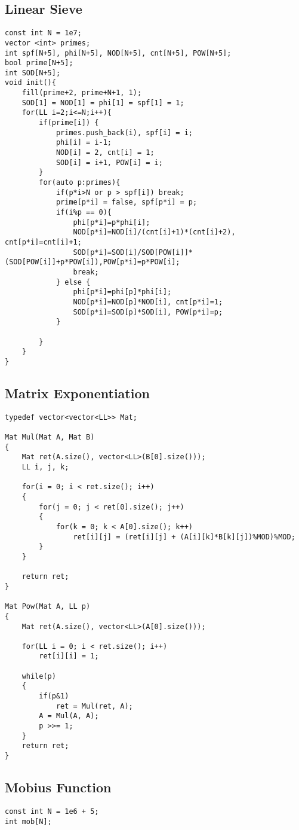 \documentclass[FSZ,a4paper,onesided]{article}
\begin{document}
\begin{multicols*}{\COLS}
\subsection{Linear Sieve}
\begin{lstlisting}
const int N = 1e7;
vector <int> primes;
int spf[N+5], phi[N+5], NOD[N+5], cnt[N+5], POW[N+5]; 
bool prime[N+5];
int SOD[N+5];
void init(){
    fill(prime+2, prime+N+1, 1);
    SOD[1] = NOD[1] = phi[1] = spf[1] = 1;
    for(LL i=2;i<=N;i++){
        if(prime[i]) {
            primes.push_back(i), spf[i] = i;
            phi[i] = i-1;
            NOD[i] = 2, cnt[i] = 1;
            SOD[i] = i+1, POW[i] = i;
        }
        for(auto p:primes){
            if(p*i>N or p > spf[i]) break;
            prime[p*i] = false, spf[p*i] = p;
            if(i%p == 0){
                phi[p*i]=p*phi[i];
                NOD[p*i]=NOD[i]/(cnt[i]+1)*(cnt[i]+2), cnt[p*i]=cnt[i]+1;
                SOD[p*i]=SOD[i]/SOD[POW[i]]*(SOD[POW[i]]+p*POW[i]),POW[p*i]=p*POW[i];
                break;
            } else {
                phi[p*i]=phi[p]*phi[i];
                NOD[p*i]=NOD[p]*NOD[i], cnt[p*i]=1;
                SOD[p*i]=SOD[p]*SOD[i], POW[p*i]=p;
            }

        }
    }
}

\end{lstlisting}
\subsection{Matrix Exponentiation}
\begin{lstlisting}
typedef vector<vector<LL>> Mat;

Mat Mul(Mat A, Mat B)
{
    Mat ret(A.size(), vector<LL>(B[0].size()));
    LL i, j, k;

    for(i = 0; i < ret.size(); i++)
    {
        for(j = 0; j < ret[0].size(); j++)
        {
            for(k = 0; k < A[0].size(); k++)
                ret[i][j] = (ret[i][j] + (A[i][k]*B[k][j])%MOD)%MOD;
        }
    }

    return ret;
}

Mat Pow(Mat A, LL p)
{
    Mat ret(A.size(), vector<LL>(A[0].size()));

    for(LL i = 0; i < ret.size(); i++)
        ret[i][i] = 1;

    while(p)
    {
        if(p&1)
            ret = Mul(ret, A);
        A = Mul(A, A);
        p >>= 1;
    }
    return ret;
}
\end{lstlisting}
\subsection{Mobius Function}
\begin{lstlisting}
const int N = 1e6 + 5;
int mob[N];


\end{lstlisting}
\end{multicols*}
\end{document}

